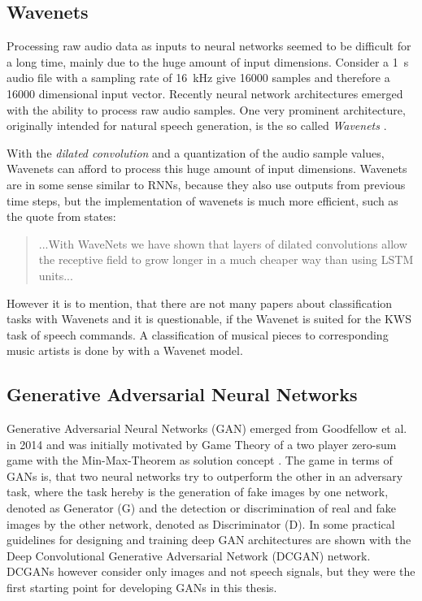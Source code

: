 \subsection{Wavenets}\label{sec:prev_nn_wavenet}
Processing raw audio data as inputs to neural networks seemed to be difficult for a long time, mainly due to the huge amount of input dimensions.
Consider a \SI{1}{\second} audio file with a sampling rate of \SI{16}{\kilo\hertz} give 16000 samples and therefore a 16000 dimensional input vector.
Recently neural network architectures emerged with the ability to process raw audio samples.
One very prominent architecture, originally intended for natural speech generation, is the so called \emph{Wavenets} \cite{Oord2016}.

With the \emph{dilated convolution} and a quantization of the audio sample values, Wavenets can afford to process this huge amount of input dimensions.
Wavenets are in some sense similar to RNNs, because they also use outputs from previous time steps, but the implementation of wavenets is much more efficient, such as the quote from \cite{Oord2016} states:
\begin{quote}
  ...With WaveNets we have shown that layers of dilated convolutions allow the receptive field to grow longer in a much cheaper way than using LSTM units...
\end{quote}
However it is to mention, that there are not many papers about classification tasks with Wavenets and it is questionable, if the Wavenet is suited for the KWS task of speech commands.
A classification of musical pieces to corresponding music artists is done by \cite{Zhang2020} with a Wavenet model.



\subsection{Generative Adversarial Neural Networks}\label{sec:prev_nn_adv}
Generative Adversarial Neural Networks (GAN) emerged from Goodfellow et al. in 2014 \cite{Goodfellow2014} and was initially motivated by Game Theory of a two player zero-sum game with the Min-Max-Theorem as solution concept \cite{VonNeumann1944}.
The game in terms of GANs is, that two neural networks try to outperform the other in an adversary task, where the task hereby is the generation of fake images by one network, denoted as Generator (G) and the detection or discrimination of real and fake images by the other network, denoted as Discriminator (D).
In \cite{Radford2016} some practical guidelines for designing and training deep GAN architectures are shown with the Deep Convolutional Generative Adversarial Network (DCGAN) network.
DCGANs however consider only images and not speech signals, but they were the first starting point for developing GANs in this thesis.

